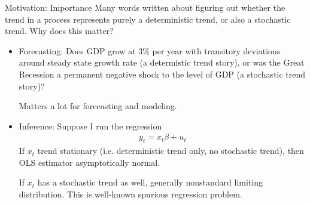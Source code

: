 \documentclass[aspectratio=169, handout]{beamer}
\begin{document}
{\footnotesize
\begin{frame}{Motivation: Importance}
Many words written about figuring out whether the trend in
a process represents purely a \alert{deterministic} trend, or also a
\alert{stochastic trend}.
Why does this matter?
\begin{itemize}
  \item \alert{Forecasting}:
    Does GDP grow at 3\% per year with transitory deviations around
    steady state growth rate (a determistic trend story),
    or was the Great Recession a
    \alert{permanent} negative shock to the level of GDP (a
    stochastic trend story)?

    Matters \alert{a lot} for forecasting and modeling.

  \pause
  \item \alert{Inference}:
    Suppose I run the regression
    \begin{align*}
      y_t = x_t \beta + u_t
    \end{align*}
    If $x_t$ \alert{trend stationary} (i.e. deterministic trend only, no
    stochastic trend), then OLS estimator \alert{asymptotically normal}.

    \pause
    If $x_t$ has a \alert{stochastic trend} as well, generally
    \alert{nonstandard} limiting distribution.
    This is well-known \alert{spurious regression} problem.
\end{itemize}
\end{frame}
}


\end{document}
